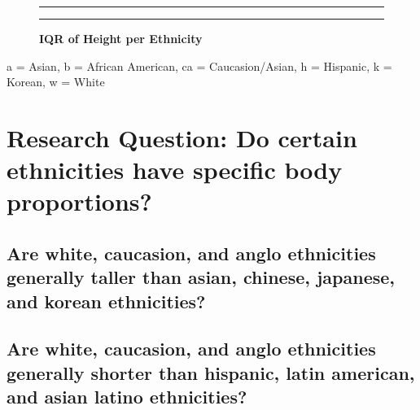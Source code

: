 \documentclass[]{article}
\begin{document}
\begin{figure}[!ht]
    \hrule
    \caption{ \textbf{IQR of Height per Ethnicity} }
    \begin{center}
    \end{center}
    \label{fig:TwoPlot}
    \hrule
\end{figure}

\newpage

a = Asian, b = African American, ca = Caucasion/Asian, h = Hispanic, k =
Korean, w = White

\section{Research Question:  Do certain ethnicities have specific body proportions?}
\label{sec:rq}

\subsection{Are white, caucasion, and anglo ethnicities generally taller than asian, chinese, japanese, and korean ethnicities?}
\label{sec:rq2}

\subsection{Are white, caucasion, and anglo ethnicities generally shorter than hispanic, latin american, and asian latino ethnicities?}
\label{sec:rq3}
\end{document}
